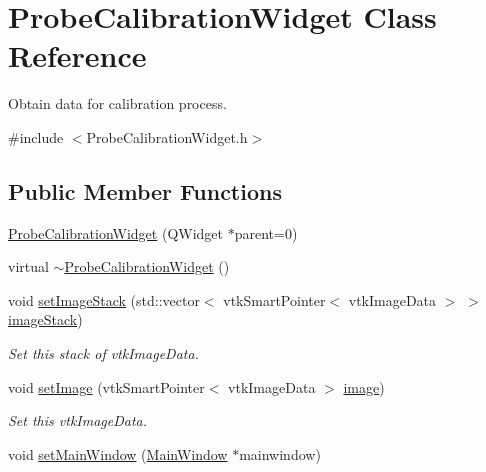 \hypertarget{class_probe_calibration_widget}{\section{Probe\-Calibration\-Widget Class Reference}
\label{d2/d39/class_probe_calibration_widget}
}


Obtain data for calibration process.  




{\ttfamily \#include $<$Probe\-Calibration\-Widget.\-h$>$}

\subsection*{Public Member Functions}
\begin{DoxyCompactItemize}
\item 
\hyperlink{class_probe_calibration_widget_a6c430e06b9cc85ea1f35c450ed1a421b}{Probe\-Calibration\-Widget} (Q\-Widget $\ast$parent=0)
\item 
virtual \hyperlink{class_probe_calibration_widget_af4234866a388c0839431195e0b34310e}{$\sim$\-Probe\-Calibration\-Widget} ()
\item 
void \hyperlink{class_probe_calibration_widget_aa2ad548059e24e10bfcc4d87159b8ae8}{set\-Image\-Stack} (std\-::vector$<$ vtk\-Smart\-Pointer$<$ vtk\-Image\-Data $>$ $>$ \hyperlink{class_probe_calibration_widget_adf05803fc62518128463039d5b46ac28}{image\-Stack})
\begin{DoxyCompactList}\small\item\em Set this stack of vtk\-Image\-Data. \end{DoxyCompactList}\item 
void \hyperlink{class_probe_calibration_widget_aada45ee83e39d4df27cdc6bb6255c870}{set\-Image} (vtk\-Smart\-Pointer$<$ vtk\-Image\-Data $>$ \hyperlink{class_probe_calibration_widget_a5f639b7a6f3c520427f245e44c51c962}{image})
\begin{DoxyCompactList}\small\item\em Set this vtk\-Image\-Data. \end{DoxyCompactList}\item 
void \hyperlink{class_probe_calibration_widget_a852e585c1976dd0c141f30fbaf96b25e}{set\-Main\-Window} (\hyperlink{class_main_window}{Main\-Window} $\ast$mainwindow)
\end{DoxyCompactItemize}
